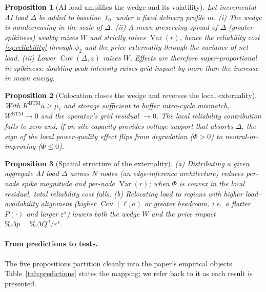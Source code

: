 \documentclass[a4paper,fleqn,longmktitle]{cas-sc}
\theoremstyle{plain}
\newtheorem{proposition}{Proposition}
\theoremstyle{definition}
\newcommand{\Var}{\operatorname{Var}}
\newcommand{\Cov}{\operatorname{Cov}}
\newcommand{\BTM}{\mathrm{BTM}}
\begin{document}
\begin{proposition}[AI load amplifies the wedge and its volatility]\label{prop:ai-amplifies}
Let incremental AI load $\Delta$ be added to baseline $\ell_0$ under a fixed delivery profile $m$. (i) The wedge is nondecreasing in the scale of $\Delta$. (ii) A mean-preserving spread of $\Delta$ (greater spikiness) weakly raises $W$ and strictly raises $\Var(r)$, hence the reliability cost \eqref{eq:reliability} through $\phi_2$ and the price externality through the variance of net load. (iii) Lower $\Cov(\Delta,a)$ raises $W$. Effects are therefore super-proportional in spikiness: doubling peak intensity raises grid impact by more than the increase in mean energy.
\end{proposition}

\begin{proposition}[Colocation closes the wedge and reverses the local externality]\label{prop:colocation}
With $K^{\BTM}\bar a\ge\mu_\ell$ and storage sufficient to buffer intra-cycle mismatch, $W^{\BTM}\to 0$ and the operator's grid residual $\to 0$. The local reliability contribution falls to zero and, if on-site capacity provides voltage support that absorbs $\Delta$, the sign of the local power-quality effect flips from degradation ($\Phi>0$) to neutral-or-improving ($\Phi\le 0$).
\end{proposition}

\begin{proposition}[Spatial structure of the externality]\label{prop:spatial}
(a) Distributing a given aggregate AI load $\Delta$ across $N$ nodes (an edge-inference architecture) reduces per-node spike magnitude and per-node $\Var(r)$; when $\Phi$ is convex in the local residual, total reliability cost falls. (b) Relocating load to regions with higher load--availability alignment (higher $\Cov(\ell,a)$ or greater headroom, i.e.\ a flatter $P(\cdot)$ and larger $\varepsilon^s$) lowers both the wedge $W$ and the price impact $\%\Delta p=\%\Delta Q^d/\varepsilon^s$.
\end{proposition}

\paragraph{From predictions to tests.} The five propositions partition cleanly into the paper's empirical objects. Table~\ref{tab:predictions} states the mapping; we refer back to it as each result is presented.
\end{document}
